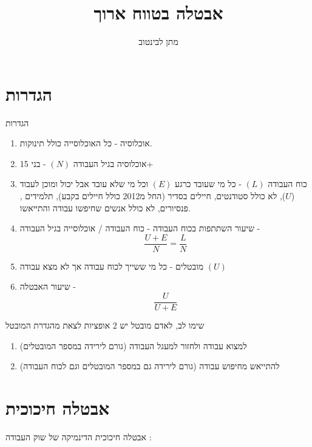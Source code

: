 \documentclass{beamer}
\title[]{אבטלה בטווח ארוך}
\author{מתן לבינטוב}
\institute[{{ אב"ג}}]{{ אוניברסיטת בן גוריון בנגב}}
\date{}
\begin{document}
\begin{RTL}
\begin{frame}
\titlepage
\end{frame}
\begin{frame}
    \tableofcontents[sectionstyle=show,
    subsectionstyle=show/shaded/hide,
    subsubsectionstyle=show/shaded/hide]
\end{frame}

\section{הגדרות}
\begin{frame}[allowframebreaks]{הגדרות}
    \begin{enumerate}
        \item אוכלוסיה - כל האוכלוסייה כולל תינוקות.
        \item אוכלוסיה בגיל העבודה $(N)$ - בני 15+ 
        \item כוח העבודה $(L)$ - כל מי שעובד כרגע $(E)$ וכל מי שלא עובד אבל יכול ומוכן לעבוד ($U$), לא כולל סטודנטים, חיילים בסדיר (החל מ2012 כולל חיילים בקבע), תלמידים , פנסיורים, לא כולל אנשים שחיפשו עבודה והתייאשו.
        \item שיעור השתתפות בכוח העבודה - כוח העבודה / אוכלוסייה בגיל העבודה - $$\frac{U + E}{N} = \frac{L}{N}$$
        \item מובטלים - כל מי ששייך לכוח עבודה אך לא מצא עבודה $\left(U\right)$
        \item שיעור האבטלה - $$\frac{U}{U+E}$$
    \end{enumerate}
    
    \framebreak

    \begin{block}{שימו לב, לאדם מובטל יש 2 אופציות לצאת מהגדרת המובטל}
        \begin{enumerate}
            \item למצוא עבודה ולחזור למעגל העבודה (גורם לירידה במספר המובטלים)
            \item להתייאש מחיפוש עבודה (גורם לירידה גם במספר המובטלים וגם לכוח העבודה)
        \end{enumerate}
    \end{block}
\end{frame}
\section{אבטלה חיכוכית}
\begin{frame}[allowframebreaks]{אבטלה חיכוכית}
    הדינמיקה של שוק העבודה : 
    \begin{center}
        \begin{tikzpicture}[
            box/.style={rectangle, draw, minimum width=2.5cm, minimum height=1cm, fill=orange!30},
            myarrow/.style={-Stealth, thick, black}
        ][H]
        

\end{tikzpicture}
\end{center}
\end{frame}
\end{RTL}
\end{document}
